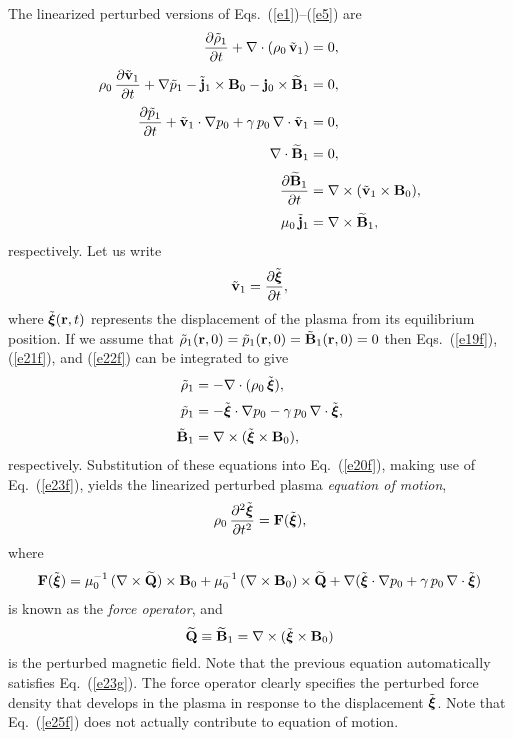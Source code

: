 \documentclass[12pt,prb,aps,notitlepage]{revtex4-1}
\newcommand{\bxi}{\mbox{\boldmath$\xi$}}
\begin{document}
The linearized perturbed versions of  Eqs.~(\ref{e1})--(\ref{e5}) are
\begin{align}
\frac{\partial\tilde{\rho}_1}{\partial t} + \nabla\cdot(\rho_0\,\tilde{\bf v}_1) & =0,\label{e19f}\\[0.5ex]
\rho_0\,\frac{\partial\tilde{\bf v}_1}{\partial t} +\nabla \tilde{p}_1 - \tilde{\bf j}_1\times {\bf B}_0-{\bf j}_0\times \widetilde{\bf B}_1&=0,\label{e20f}\\[0.5ex]
\frac{\partial \tilde{p}_1}{\partial t}+\tilde{\bf v}_1\cdot\nabla p_0 + \gamma\,p_0\,\nabla\cdot\tilde{\bf v}_1 &=0,\label{e21f}\\[0.5ex]
\nabla\cdot\widetilde{\bf B}_1&=0,\label{e23g}\\[0.5ex]
\frac{\partial \widetilde{\bf B}_1}{\partial t} &= \nabla\times(\tilde{\bf v}_1\times {\bf B}_0),\label{e22f}\\[0.5ex]
\mu_0\,\tilde{\bf j}_1 &= \nabla\times \widetilde{\bf B}_1,\label{e23f}
\end{align}
respectively. 
Let us write
\begin{equation}\label{e15x}
\tilde{\bf v}_1 = \frac{\partial\tilde{\bxi}}{\partial t},
\end{equation}
where $\tilde{\bxi}({\bf r},t)$ represents the displacement of the plasma from its equilibrium position. If
we assume that $\tilde{\rho}_1({\bf r},0)= \tilde{p}_1({\bf r},0)=\tilde{\bf B}_1({\bf r},0) = 0$ then Eqs.~(\ref{e19f}), (\ref{e21f}),
and (\ref{e22f}) can be integrated to give
\begin{align}
\tilde{\rho}_1&= -\nabla\cdot(\rho_0\,\tilde{\bxi}),\label{e25f}\\[0.5ex]
\tilde{p}_1&= -\tilde{\bxi}\cdot\nabla p_0 -\gamma\,p_0\,\nabla\cdot\tilde{\bxi},\\[0.5ex]
\tilde{\bf B}_1&= \nabla\times (\tilde{\bxi}\times {\bf B}_0),
\end{align}
respectively. 
Substitution of these equations into Eq.~(\ref{e20f}), making use of Eq.~(\ref{e23f}),  yields the linearized perturbed plasma {\em equation of motion},
\begin{equation}\label{e28f}
\rho_0\,\frac{\partial^2\tilde{\bxi}}{\partial t^2} = {\bf F}(\tilde{\bxi}),
\end{equation}
where 
\begin{align}
{\bf F}(\tilde{\bxi}) = \mu_0^{-1}\,(\nabla\times \widetilde{\bf Q})\times{\bf B}_0+ \mu_0^{-1}\, (\nabla\times {\bf B}_0)\times \widetilde{\bf Q} + 
\nabla(\tilde{\bxi}\cdot \nabla p_0 + \gamma\,p_0\,\nabla\cdot\tilde{\bxi})
\end{align}
is known as the {\em force operator}, 
and
\begin{equation}
\widetilde{\bf Q}\equiv  \widetilde{\bf B}_1= \nabla\times (\tilde{\bxi}\times {\bf B}_0)
\end{equation}
is the perturbed magnetic field. Note that the previous equation automatically satisfies Eq.~(\ref{e23g}). 
 The force operator clearly specifies the perturbed force density that develops in the plasma in
response to the displacement $\tilde{\bxi}$. Note that Eq.~(\ref{e25f}) does not actually contribute to equation of motion. 
\end{document}
